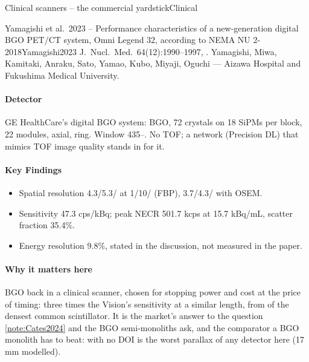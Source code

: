 \begin{programnote}{Clinical scanners -- the commercial yardstick}{Clinical}
\begin{papernote}{Yamagishi et al.\ 2023 -- Performance characteristics of a new-generation digital BGO PET/CT system, Omni Legend 32, according to NEMA NU 2-2018}{Yamagishi2023}
J.\ Nucl.\ Med.\ 64(12):1990--1997, .
Yamagishi, Miwa, Kamitaki, Anraku, Sato, Yamao, Kubo, Miyaji, Oguchi ---
Aizawa Hospital and Fukushima Medical University.

\paragraph{Detector}
GE HealthCare's digital BGO system:  BGO, 72
crystals on 18  SiPMs per block, 22 modules,
 axial,  ring. Window 435--. No TOF; a network
(Precision DL) that mimics TOF image quality stands in for it.

\paragraph{Key Findings}
\begin{itemize}
	\item Spatial resolution 4.3/5.3/ at 1/10/ (FBP),
		3.7/4.3/ with OSEM.
	\item Sensitivity 47.3 cps/kBq; peak NECR 501.7 kcps at 15.7 kBq/mL,
		scatter fraction 35.4\%.
	\item Energy resolution 9.8\%, stated in the discussion, not measured
		in the paper.
\end{itemize}

\paragraph{Why it matters here}
BGO back in a clinical scanner, chosen for stopping power and cost at the price
of timing: three times the Vision's sensitivity at a similar length, from
 of the densest common scintillator. It is the market's answer to the
question \ref{note:Cates2024} and the BGO semi-monoliths ask, and the
comparator a BGO monolith has to beat:  with no DOI is the worst
parallax of any detector here (17 mm modelled).
\end{papernote}

\end{programnote}

